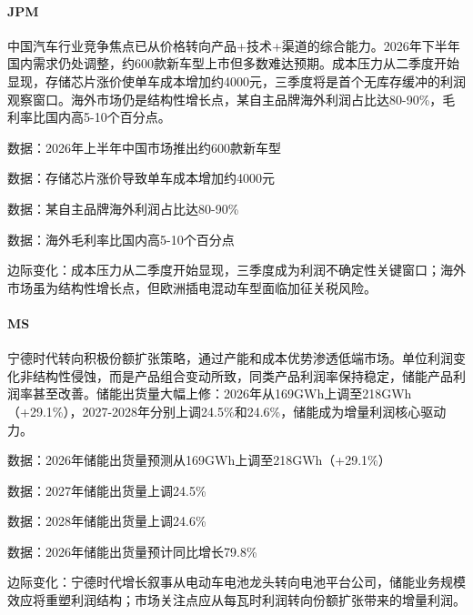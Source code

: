 \documentclass[11pt]{ctexart}
\begin{document}
\paragraph{JPM} 中国汽车行业竞争焦点已从价格转向产品+技术+渠道的综合能力。2026年下半年国内需求仍处调整，约600款新车型上市但多数难达预期。成本压力从二季度开始显现，存储芯片涨价使单车成本增加约4000元，三季度将是首个无库存缓冲的利润观察窗口。海外市场仍是结构性增长点，某自主品牌海外利润占比达80-90\%，毛利率比国内高5-10个百分点。
{\small\color{refgray}数据：2026年上半年中国市场推出约600款新车型\par}
{\small\color{refgray}数据：存储芯片涨价导致单车成本增加约4000元\par}
{\small\color{refgray}数据：某自主品牌海外利润占比达80-90\%\par}
{\small\color{refgray}数据：海外毛利率比国内高5-10个百分点\par}
{\small\color{refgray}边际变化：成本压力从二季度开始显现，三季度成为利润不确定性关键窗口；海外市场虽为结构性增长点，但欧洲插电混动车型面临加征关税风险。\par}
\paragraph{MS} 宁德时代转向积极份额扩张策略，通过产能和成本优势渗透低端市场。单位利润变化非结构性侵蚀，而是产品组合变动所致，同类产品利润率保持稳定，储能产品利润率甚至改善。储能出货量大幅上修：2026年从169GWh上调至218GWh（+29.1\%），2027-2028年分别上调24.5\%和24.6\%，储能成为增量利润核心驱动力。
{\small\color{refgray}数据：2026年储能出货量预测从169GWh上调至218GWh（+29.1\%）\par}
{\small\color{refgray}数据：2027年储能出货量上调24.5\%\par}
{\small\color{refgray}数据：2028年储能出货量上调24.6\%\par}
{\small\color{refgray}数据：2026年储能出货量预计同比增长79.8\%\par}
{\small\color{refgray}边际变化：宁德时代增长叙事从电动车电池龙头转向电池平台公司，储能业务规模效应将重塑利润结构；市场关注点应从每瓦时利润转向份额扩张带来的增量利润。\par}
\end{document}
